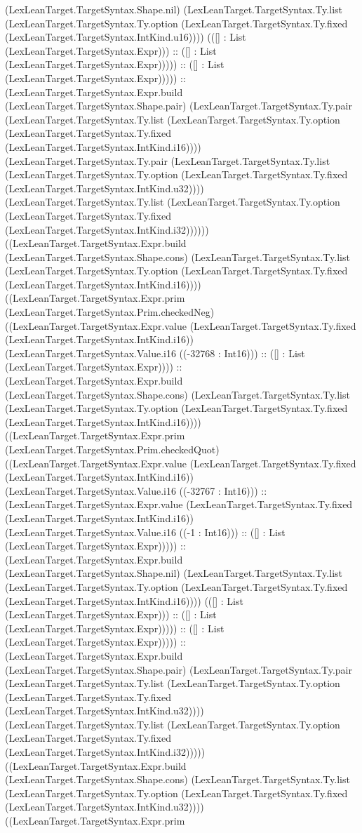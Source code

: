 \documentclass[11pt]{article}
\begin{document}
(LexLeanTarget.TargetSyntax.Shape.nil) (LexLeanTarget.TargetSyntax.Ty.list (LexLeanTarget.TargetSyntax.Ty.option (LexLeanTarget.TargetSyntax.Ty.fixed (LexLeanTarget.TargetSyntax.IntKind.u16)))) (([] : List (LexLeanTarget.TargetSyntax.Expr))) :: ([] : List (LexLeanTarget.TargetSyntax.Expr))))) :: ([] : List (LexLeanTarget.TargetSyntax.Expr))))) :: (LexLeanTarget.TargetSyntax.Expr.build (LexLeanTarget.TargetSyntax.Shape.pair) (LexLeanTarget.TargetSyntax.Ty.pair (LexLeanTarget.TargetSyntax.Ty.list (LexLeanTarget.TargetSyntax.Ty.option (LexLeanTarget.TargetSyntax.Ty.fixed (LexLeanTarget.TargetSyntax.IntKind.i16)))) (LexLeanTarget.TargetSyntax.Ty.pair (LexLeanTarget.TargetSyntax.Ty.list (LexLeanTarget.TargetSyntax.Ty.option (LexLeanTarget.TargetSyntax.Ty.fixed (LexLeanTarget.TargetSyntax.IntKind.u32)))) (LexLeanTarget.TargetSyntax.Ty.list (LexLeanTarget.TargetSyntax.Ty.option (LexLeanTarget.TargetSyntax.Ty.fixed (LexLeanTarget.TargetSyntax.IntKind.i32)))))) ((LexLeanTarget.TargetSyntax.Expr.build (LexLeanTarget.TargetSyntax.Shape.cons) (LexLeanTarget.TargetSyntax.Ty.list (LexLeanTarget.TargetSyntax.Ty.option (LexLeanTarget.TargetSyntax.Ty.fixed (LexLeanTarget.TargetSyntax.IntKind.i16)))) ((LexLeanTarget.TargetSyntax.Expr.prim (LexLeanTarget.TargetSyntax.Prim.checkedNeg) ((LexLeanTarget.TargetSyntax.Expr.value (LexLeanTarget.TargetSyntax.Ty.fixed (LexLeanTarget.TargetSyntax.IntKind.i16)) (LexLeanTarget.TargetSyntax.Value.i16 ((-32768 : Int16))) :: ([] : List (LexLeanTarget.TargetSyntax.Expr)))) :: (LexLeanTarget.TargetSyntax.Expr.build (LexLeanTarget.TargetSyntax.Shape.cons) (LexLeanTarget.TargetSyntax.Ty.list (LexLeanTarget.TargetSyntax.Ty.option (LexLeanTarget.TargetSyntax.Ty.fixed (LexLeanTarget.TargetSyntax.IntKind.i16)))) ((LexLeanTarget.TargetSyntax.Expr.prim (LexLeanTarget.TargetSyntax.Prim.checkedQuot) ((LexLeanTarget.TargetSyntax.Expr.value (LexLeanTarget.TargetSyntax.Ty.fixed (LexLeanTarget.TargetSyntax.IntKind.i16)) (LexLeanTarget.TargetSyntax.Value.i16 ((-32767 : Int16))) :: (LexLeanTarget.TargetSyntax.Expr.value (LexLeanTarget.TargetSyntax.Ty.fixed (LexLeanTarget.TargetSyntax.IntKind.i16)) (LexLeanTarget.TargetSyntax.Value.i16 ((-1 : Int16))) :: ([] : List (LexLeanTarget.TargetSyntax.Expr))))) :: (LexLeanTarget.TargetSyntax.Expr.build (LexLeanTarget.TargetSyntax.Shape.nil) (LexLeanTarget.TargetSyntax.Ty.list (LexLeanTarget.TargetSyntax.Ty.option (LexLeanTarget.TargetSyntax.Ty.fixed (LexLeanTarget.TargetSyntax.IntKind.i16)))) (([] : List (LexLeanTarget.TargetSyntax.Expr))) :: ([] : List (LexLeanTarget.TargetSyntax.Expr))))) :: ([] : List (LexLeanTarget.TargetSyntax.Expr))))) :: (LexLeanTarget.TargetSyntax.Expr.build (LexLeanTarget.TargetSyntax.Shape.pair) (LexLeanTarget.TargetSyntax.Ty.pair (LexLeanTarget.TargetSyntax.Ty.list (LexLeanTarget.TargetSyntax.Ty.option (LexLeanTarget.TargetSyntax.Ty.fixed (LexLeanTarget.TargetSyntax.IntKind.u32)))) (LexLeanTarget.TargetSyntax.Ty.list (LexLeanTarget.TargetSyntax.Ty.option (LexLeanTarget.TargetSyntax.Ty.fixed (LexLeanTarget.TargetSyntax.IntKind.i32))))) ((LexLeanTarget.TargetSyntax.Expr.build (LexLeanTarget.TargetSyntax.Shape.cons) (LexLeanTarget.TargetSyntax.Ty.list (LexLeanTarget.TargetSyntax.Ty.option (LexLeanTarget.TargetSyntax.Ty.fixed (LexLeanTarget.TargetSyntax.IntKind.u32)))) ((LexLeanTarget.TargetSyntax.Expr.prim 
\end{document}
